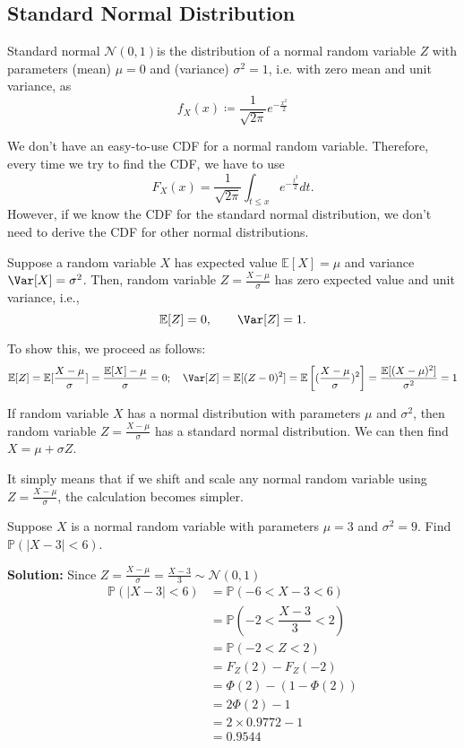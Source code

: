 \subsection{Standard Normal Distribution}
Standard normal \(\mathcal{N}(0, 1)\)is the distribution of a normal random variable \(Z\) with parameters (mean) \(\mu = 0\) and (variance) \(\sigma^2 = 1\), i.e. with zero mean and unit variance, as 
\[
    f_X(x) \coloneqq \dfrac{1}{\sqrt{2\pi}} e^{-\frac{x^2}{2}}
\]

We don't have an easy-to-use CDF for a normal random variable. Therefore, every time we try to find the CDF, we have to use
\[
    F_X(x) = \dfrac{1}{\sqrt{2\pi}} \int_{t \leq x} e^{-\frac{t^2}{2}}dt. 
\]
However, if we know the CDF for the standard normal distribution, we don't need to derive the CDF for other normal distributions.

Suppose a random variable \(X\) has expected value \(\mathbb{E}[X] = \mu\) and variance \(\Var[X] = \sigma^2\). Then, random variable \(Z = \frac{X - \mu}{\sigma}\) has zero expected value and unit variance, i.e.,
\[
    \mathbb{E}[Z] = 0, \quad\quad \Var[Z] = 1.
\]

To show this, we proceed as follows: 
\[
    \mathbb{E}[Z] = \mathbb{E}[\dfrac{X - \mu}{\sigma}] = \dfrac{\mathbb{E}[X] - \mu}{\sigma} = 0 ;\quad \Var[Z] = \mathbb{E}[(Z - 0)^2] = \mathbb{E}\left[(\dfrac{X - \mu}{\sigma})^2\right] = \dfrac{\mathbb{E}[(X - \mu)^2]}{\sigma^2} = 1
\]

If random variable \(X\) has a normal distribution with parameters \(\mu\) and \(\sigma^2\), then random variable \(Z = \frac{X - \mu}{\sigma}\) has a standard normal distribution. We can then find \(X = \mu + \sigma Z\). 

It simply means that if we shift and scale any normal random variable using \(Z = \frac{X - \mu}{\sigma}\), the calculation becomes simpler.

\begin{eg}
    Suppose \(X\) is a normal random variable with parameters \(\mu = 3\) and \(\sigma^2 = 9\). Find \(\mathbb{P}(\vert X - 3 \vert < 6)\).

    \textbf{Solution:} 
    Since \(Z = \frac{X - \mu}{\sigma} = \frac{X - 3}{3} \sim \mathcal{N}(0, 1)\) 
    \[
        \begin{aligned}
            \mathbb{P}(\vert X - 3 \vert < 6) &= \mathbb{P}(-6 <  X - 3 < 6) \\
            &= \mathbb{P}(-2 < \dfrac{X - 3}{3} < 2) \\
            &= \mathbb{P}(-2 < Z < 2) \\
            &= F_Z(2) - F_Z(-2) \\
            &= \varPhi (2) - (1 - \varPhi (2)) \\
            &= 2\varPhi (2) - 1 \\
            &= 2 \times 0.9772 - 1 \\
            &= 0.9544
        \end{aligned}
    \]
\end{eg}

